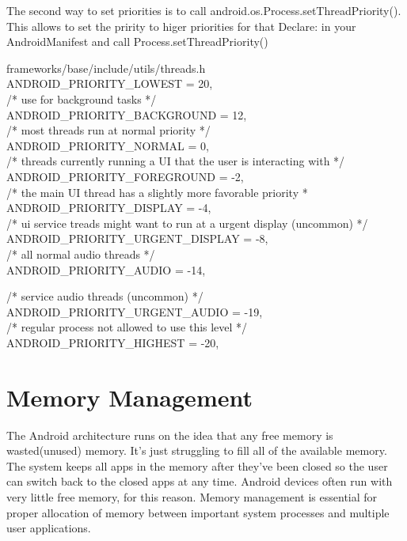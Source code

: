 \documentclass[preprint,12pt]{elsarticle}
\begin{document}
The second way to set priorities is to call android.os.Process.setThreadPriority(). This allows to set the pririty to higer priorities for that
Declare: in your AndroidManifest and call Process.setThreadPriority()

frameworks/base/include/utils/threads.h\\
    ANDROID\_PRIORITY\_LOWEST         =  20,\\

    /* use for background tasks */\\
    ANDROID\_PRIORITY\_BACKGROUND     =  12,\\

    /* most threads run at normal priority */\\
    ANDROID\_PRIORITY\_NORMAL         =   0,\\

    /* threads currently running a UI that the user is interacting with */\\
    ANDROID\_PRIORITY\_FOREGROUND     =  -2,\\

    /* the main UI thread has a slightly more favorable priority *\\
    ANDROID\_PRIORITY\_DISPLAY        =  -4,\\
    /* ui service treads might want to run at a urgent display (uncommon) */\\
    ANDROID\_PRIORITY\_URGENT\_DISPLAY =  -8,\\

    /* all normal audio threads */\\
    ANDROID\_PRIORITY\_AUDIO          = -14,

    /* service audio threads (uncommon) */\\
    ANDROID\_PRIORITY\_URGENT\_AUDIO   = -19,\\

    /* regular process  not allowed to use this level */\\
    ANDROID\_PRIORITY\_HIGHEST        = -20,

\section{\large{Memory Management}}
The Android architecture runs on the idea that any free memory is wasted(unused) memory. It's just struggling to fill all of the available memory. The system keeps all apps in the memory after they've been closed so the user can switch back to the closed apps at any time. Android devices often run with very little free memory, for this reason. Memory management is essential for proper allocation of memory between important system processes and multiple user applications.   
\end{document}
